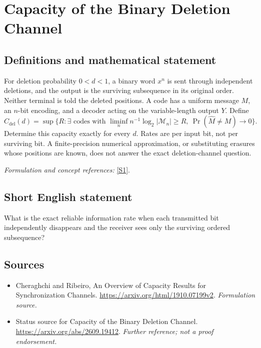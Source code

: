 \documentclass[11pt]{article}
\begin{document}
\section*{\texorpdfstring{Capacity of the Binary Deletion Channel}{Capacity of the Binary Deletion Channel}}\label{225}
\subsection{Definitions and mathematical statement}
For deletion probability $0<d<1$, a binary word $x^n$ is sent through independent deletions, and the output is the surviving subsequence in its original order. Neither terminal is told the deleted positions. A code has a uniform message $M$, an $n$-bit encoding, and a decoder acting on the variable-length output $Y$. Define
\[
 C_{\mathrm{del}}(d)=\sup\{R:\exists\text{ codes with }\liminf_n n^{-1}\log_2|\mathcal M_n|\ge R,
 \ \Pr(\widehat M\ne M)\to0\}.
\]
Determine this capacity exactly for every $d$. Rates are per input bit, not per surviving bit. A finite-precision numerical approximation, or substituting erasures whose positions are known, does not answer the exact deletion-channel question.
\par\smallskip\textit{Formulation and concept references:} \href{https://arxiv.org/html/1910.07199v2}{[S1]}.

\subsection{Short English statement}
What is the exact reliable information rate when each transmitted bit independently disappears and the receiver sees only the surviving ordered subsequence?
\subsection{Sources}
\begin{itemize}
\item[S1]Cheraghchi and Ribeiro, An Overview of Capacity Results for Synchronization Channels.
\url{https://arxiv.org/html/1910.07199v2}.
\textit{Formulation source.}
\item[S2]Status source for Capacity of the Binary Deletion Channel.
\url{https://arxiv.org/abs/2609.19412}.
\textit{Further reference; not a proof endorsement.}
\end{itemize}
\end{document}
